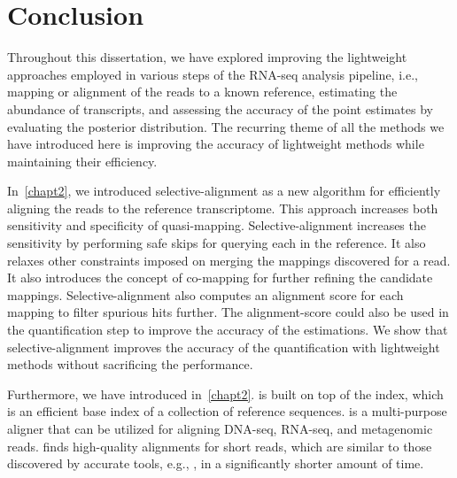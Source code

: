 
\renewcommand{\thechapter}{5}

\chapter[Conclusion]{Conclusion} 
\label{conclusion}

Throughout this dissertation, we have explored improving the lightweight approaches employed 
in various steps of the RNA-seq analysis pipeline, i.e., mapping or alignment of the reads to 
a known reference, estimating the abundance of transcripts, and assessing the accuracy of the 
point estimates by evaluating the posterior distribution.
The recurring theme of all the methods we have introduced here is improving the accuracy of 
lightweight methods while maintaining their efficiency.
 
In~\cref{chapt2}, we introduced selective-alignment as a new algorithm for efficiently
aligning the reads to the reference transcriptome. This approach increases both sensitivity
and specificity of quasi-mapping. Selective-alignment increases the sensitivity by performing
safe skips for querying each \kmer in the reference. It also relaxes other constraints
imposed on merging the mappings discovered for a read. It also introduces the concept of
co-mapping for further refining the candidate mappings. Selective-alignment also computes
an alignment score for each mapping to filter spurious hits further. The alignment-score
could also be used in the quantification step to improve the accuracy of the estimations.
We show that selective-alignment improves the accuracy of the quantification with lightweight
methods without sacrificing the performance.
 
Furthermore, we have introduced \puffaligner in~\cref{chapt2}. \puffaligner is built on top
of the \pufferfish index, which is an efficient \ccdbg base index of a collection of reference
sequences. \puffaligner is a multi-purpose aligner that can be utilized for aligning DNA-seq,
RNA-seq, and metagenomic reads. \puffaligner finds high-quality alignments for short reads,
which are similar to those discovered by accurate tools, e.g., \bt, in a significantly shorter amount
of time.
 
